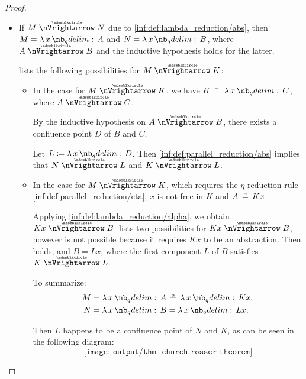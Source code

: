 \begin{proof}
\begin{itemize}
    \item If \( M \ppred N \) due to \ref{inf:def:lambda_reduction/abs}, then \( M = \qabs x A \) and \( N = \qabs x B \), where \( A \ppred B \) and the inductive hypothesis holds for the latter.

     lists the following possibilities for \( M \ppred K \):
    \begin{itemize}
      \item In the case  for \( M \ppred K \), we have \( K \aequiv \qabs x C \), where \( A \ppred C \).

      By the inductive hypothesis on \( A \ppred B \), there exists a confluence point \( D \) of \( B \) and \( C \).

      Let \( L \coloneqq \qabs x D \). Then \ref{inf:def:parallel_reduction/abs} implies that \( N \ppred L \) and \( K \ppred L \).

      \item In the case  for \( M \ppred K \), which requires the \( \eta \)-reduction rule \ref{inf:def:parallel_reduction/eta}, \( x \) is not free in \( K \) and \( A \aequiv Kx \).

      Applying \ref{inf:def:lambda_reduction/alpha}, we obtain \( Kx \ppred B \).  lists two possibilities for \( Kx \ppred B \), however  is not possible because it requires \( Kx \) to be an abstraction. Then  holds, and \( B = Lx \), where the first component \( L \) of \( B \) satisfies \( K \ppred L \).

      To summarize:
      \begin{align*}
        M &= \qabs x A \aequiv \qabs x Kx, \\
        N &= \qabs x B = \qabs x Lx. \\
      \end{align*}

      Then \( L \) happens to be a confluence point of \( N \) and \( K \), as can be seen in the following diagram:
      \begin{equation*}
        \texttt{[image: output/thm\_\_church\_rosser\_theorem]}
      \end{equation*}
    \end{itemize}


\end{itemize}
\end{proof}
